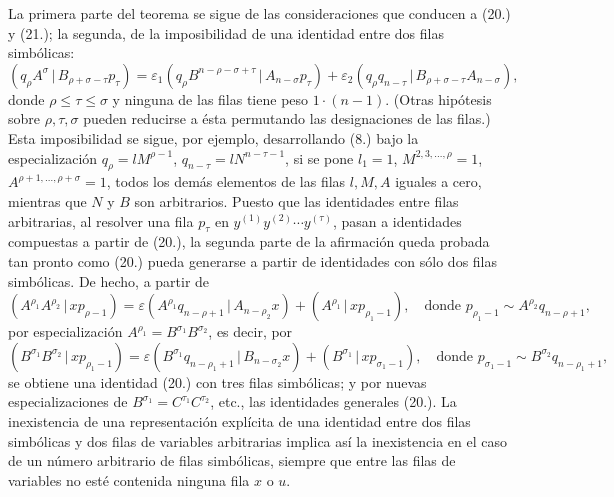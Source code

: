 \documentclass[11pt]{article}
\newcommand{\pair}[2]{(#1\,|\,#2)}
\newcommand{\eps}{\varepsilon}
\begin{document}
La primera parte del teorema se sigue de las consideraciones que conducen a (20.) y (21.); la segunda, de la imposibilidad de una identidad entre dos filas simbólicas:
\[
\pair{q_\rho A^\sigma}{B_{\rho+\sigma-\tau}p_\tau}
=\eps_1\pair{q_\rho B^{n-\rho-\sigma+\tau}}{A_{n-\sigma}p_\tau}
+\eps_2\pair{q_\rho q_{n-\tau}}{B_{\rho+\sigma-\tau}A_{n-\sigma}},
\]
donde $\rho\le\tau\le\sigma$ y ninguna de las filas tiene peso $1\cdot(n-1)$. (Otras hipótesis sobre $\rho,\tau,\sigma$ pueden reducirse a ésta permutando las designaciones de las filas.) Esta imposibilidad se sigue, por ejemplo, desarrollando (8.) bajo la especialización $q_\rho=lM^{\rho-1}$, $q_{n-\tau}=lN^{n-\tau-1}$, si se pone $l_1=1$, $M^{2,3,\ldots,\rho}=1$, $A^{\rho+1,\ldots,\rho+\sigma}=1$, todos los demás elementos de las filas $l,M,A$ iguales a cero, mientras que $N$ y $B$ son arbitrarios. Puesto que las identidades entre filas arbitrarias, al resolver una fila $p_\tau$ en $y^{(1)}y^{(2)}\cdots y^{(\tau)}$, pasan a identidades compuestas a partir de (20.), la segunda parte de la afirmación queda probada tan pronto como (20.) pueda generarse a partir de identidades con sólo dos filas simbólicas. De hecho, a partir de
\begin{equation}
\pair{A^{\rho_1}A^{\rho_2}}{xp_{\rho-1}}
=\eps\pair{A^{\rho_1}q_{n-\rho+1}}{A_{n-\rho_2}x}
+\pair{A^{\rho_1}}{xp_{\rho_1-1}},
\quad \text{donde }p_{\rho_1-1}\sim A^{\rho_2}q_{n-\rho+1},
\tag{20a}
\end{equation}
por especialización $A^{\rho_1}=B^{\sigma_1}B^{\sigma_2}$, es decir, por
\[
\pair{B^{\sigma_1}B^{\sigma_2}}{xp_{\rho_1-1}}
=\eps\pair{B^{\sigma_1}q_{n-\rho_1+1}}{B_{n-\sigma_2}x}
+\pair{B^{\sigma_1}}{xp_{\sigma_1-1}},
\quad \text{donde } p_{\sigma_1-1}\sim B^{\sigma_2}q_{n-\rho_1+1},
\]
se obtiene una identidad (20.) con tres filas simbólicas; y por nuevas especializaciones de $B^{\sigma_1}=C^{\tau_1}C^{\tau_2}$, etc., las identidades generales (20.). La inexistencia de una representación explícita de una identidad entre dos filas simbólicas y dos filas de variables arbitrarias implica así la inexistencia en el caso de un número arbitrario de filas simbólicas, siempre que entre las filas de variables no esté contenida ninguna fila $x$ o $u$.
\end{document}
